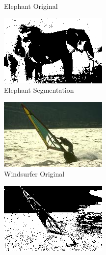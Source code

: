 \documentclass[11pt]{article}
\begin{document}
\begin{figure}
\begin{subfigure}[b]{0.4\textwidth}
\caption{Elephant Original}
\label{fig:ev3:r10}
\end{subfigure}
\begin{subfigure}[b]{0.4\textwidth}
\centering
\includegraphics[width=\textwidth]{elephants_seg_ev4}
\caption{Elephant Segmentation}
\label{fig:ev4:r10}
\end{subfigure}
\begin{subfigure}[b]{0.4\textwidth}
\centering
\includegraphics[width=\textwidth]{windsurf_sm}
\caption{Windsurfer Original}
\label{fig:ev5:r10}
\end{subfigure}
\begin{subfigure}[b]{0.4\textwidth}
\centering
\includegraphics[width=\textwidth]{windsurf_seg_ev6}

\end{subfigure}
\end{figure}
\end{document}
